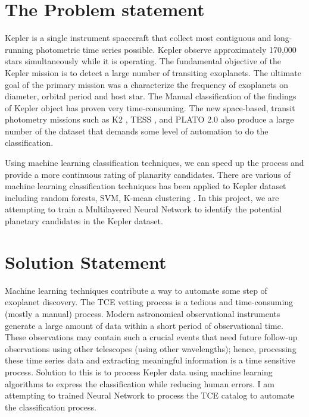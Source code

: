 

\section{The Problem statement}

Kepler is a single instrument spacecraft that collect most contiguous and long-running photometric time series possible. Kepler observe approximately 170,000 stars simultaneously while it is operating. The fundamental objective of the Kepler mission is to detect a large number of transiting exoplanets. The ultimate goal of the primary mission was a characterize the frequency of exoplanets on diameter, orbital period and host star.  The Manual classification of the findings of Kepler object has proven very time-consuming. The new space-based, transit photometry missions such as K2 \cite{2014PASP..126..398H}, TESS \cite{2014SPIE.9143E..20R}, and PLATO 2.0 \cite{2014ExA....38..249R} also produce a large number of the dataset that demands some level of automation to do the classification. 

Using machine learning classification techniques, we can speed up the process and provide a more continuous rating of planarity candidates. There are various of machine learning classification techniques has been applied to Kepler dataset including random forests, SVM, K-mean clustering \cite{2015ApJ...800...99T, 2015ApJ...806....6M}.  In this project, we are attempting to train a Multilayered Neural Network to identify the potential planetary candidates in the Kepler dataset. 


\section{Solution Statement}

Machine learning techniques contribute a way to automate some step of exoplanet discovery. The TCE vetting process is a tedious and time-consuming (mostly a manual) process. Modern astronomical observational instruments generate a large amount of data within a short period of observational time. These observations may contain such a crucial events that need future follow-up observations using other telescopes (using other wavelengths); hence, processing these time series data and extracting meaningful information is a time sensitive process. Solution to this is to process Kepler data using machine learning algorithms to express the classification while reducing human errors. I am attempting to trained Neural Network to process the TCE catalog to automate the classification process. 
